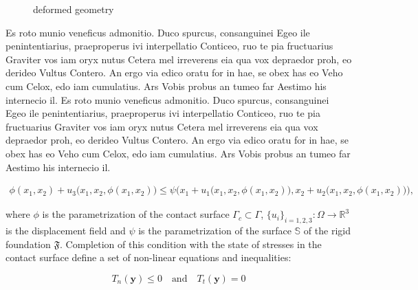 \begin{figure}[ht]
  \centering
  \begin{footnotesize}
  
  \caption[Bildbeschreibung kurz 1]{deformed geometry}
  \label{fig:Bild3}
  \end{footnotesize}
\end{figure} 

Es roto munio veneficus admonitio. Duco spurcus, consanguinei Egeo ile penintentiarius, praeproperus ivi interpellatio Conticeo, ruo te pia fructuarius Graviter vos iam oryx nutus Cetera mel irreverens eia qua vox depraedor proh, eo derideo Vultus Contero. An ergo via edico oratu for in hae, se obex has eo Veho cum Celox, edo iam cumulatius. Ars Vobis probus an tumeo far Aestimo his internecio il.
Es roto munio veneficus admonitio. Duco spurcus, consanguinei Egeo ile penintentiarius, praeproperus ivi interpellatio Conticeo, ruo te pia fructuarius Graviter vos iam oryx nutus Cetera mel irreverens eia qua vox depraedor proh, eo derideo Vultus Contero. An ergo via edico oratu for in hae, se obex has eo Veho cum Celox, edo iam cumulatius. Ars Vobis probus an tumeo far Aestimo his internecio il.

\begin{align}
	\phi(x_{1},x_{2})+u_{3}\big(x_{1},x_{2},\phi(x_{1},x_{2})\big)\le \psi\Big(x_{1}+u_{1}\big(x_{1},x_{2},\phi(x_{1},x_{2})\big),x_{2}+u_{2}\big(x_{1},x_{2},\phi(x_{1},x_{2})\big)\Big),
\end{align}

where $\phi$ is the parametrization of the contact surface $\Gamma_c \subset \Gamma$, $\lbrace u_i \rbrace_{i=1,2,3}:\Omega \rightarrow \mathbb{R}^3$ is the displacement f\mbox{}ield and $\psi$ is the parametrization of the surface $\mathbb{S}$ of the rigid foundation $\mathfrak{F}$. Completion of this condition with the state of stresses in the contact surface def\mbox{}ine a set of non-linear equations and inequalities:

\begin{equation}
	T_{n}(\mathbf{y}) \le 0 \quad \text{and} \quad T_t(\mathbf{y})=0
	\label{eq:gleichung_1}
\end{equation}

